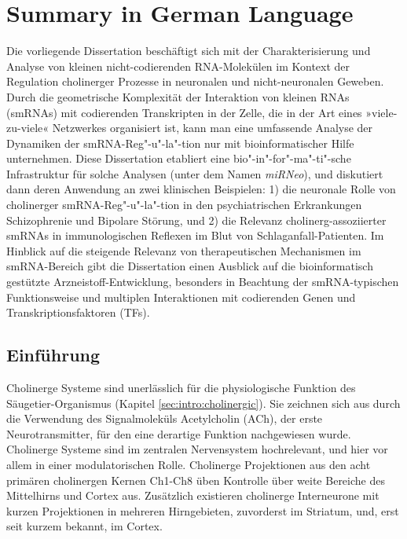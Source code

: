 \section{Summary in German Language}
Die vorliegende Dissertation beschäftigt sich mit der Charakterisierung und Analyse von kleinen nicht-codierenden RNA-Molekülen im Kontext der Regulation cholinerger Prozesse in neuronalen und nicht-neuronalen Geweben. Durch die geometrische Komplexität der Interaktion von kleinen RNAs (smRNAs) mit codierenden Transkripten in der Zelle, die in der Art eines »viele-zu-viele« Netzwerkes organisiert ist, kann man eine umfassende Analyse der Dynamiken der smRNA-Reg"-u"-la"-tion nur mit bioinformatischer Hilfe unternehmen. Diese Dissertation etabliert eine bio"-in"-for"-ma"-ti"-sche Infrastruktur für solche Analysen (unter dem Namen \emph{miRNeo}), und diskutiert dann deren Anwendung an zwei klinischen Beispielen: 1) die neuronale Rolle von cholinerger smRNA-Reg"-u"-la"-tion in den psychiatrischen Erkrankungen Schizophrenie und Bipolare Störung,\cite{Lobentanzer2019a} und 2) die Relevanz cholinerg-assoziierter smRNAs in immunologischen Reflexen im Blut von Schlaganfall-Patienten.\cite{Winek2020} Im Hinblick auf die steigende Relevanz von therapeutischen Mechanismen im smRNA-Bereich gibt die Dissertation einen Ausblick auf die bioinformatisch gestützte Arzneistoff-Entwicklung, besonders in Beachtung der smRNA-typischen Funktionsweise und multiplen Interaktionen mit codierenden Genen und Transkriptionsfaktoren (TFs).

\subsection{Einführung}
Cholinerge Systeme sind unerlässlich für die physiologische Funktion des Säugetier-Organismus (Kapitel \ref{sec:intro:cholinergic}). Sie zeichnen sich aus durch die Verwendung des Signalmoleküls Acetylcholin (ACh), der erste Neurotransmitter, für den eine derartige Funktion nachgewiesen wurde.\cite{Dale1914,Loewi1921,Dale1929} Cholinerge Systeme sind im zentralen Nervensystem hochrelevant, und hier vor allem in einer modulatorischen Rolle. Cholinerge Projektionen aus den acht primären cholinergen Kernen Ch1-Ch8 üben Kontrolle über weite Bereiche des Mittelhirns und Cortex aus.\cite{Mesulam1984} Zusätzlich existieren cholinerge Interneurone mit kurzen Projektionen in mehreren Hirngebieten, zuvorderst im Striatum, und, erst seit kurzem bekannt, im Cortex.

